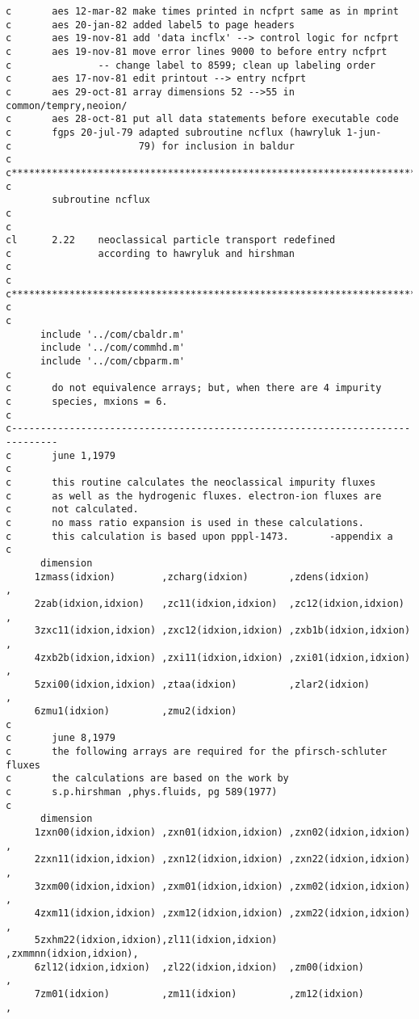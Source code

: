 \begin{verbatim}
c       aes 12-mar-82 make times printed in ncfprt same as in mprint
c       aes 20-jan-82 added label5 to page headers
c       aes 19-nov-81 add 'data incflx' --> control logic for ncfprt
c       aes 19-nov-81 move error lines 9000 to before entry ncfprt
c               -- change label to 8599; clean up labeling order
c       aes 17-nov-81 edit printout --> entry ncfprt
c       aes 29-oct-81 array dimensions 52 -->55 in common/tempry,neoion/
c       aes 28-oct-81 put all data statements before executable code
c       fgps 20-jul-79 adapted subroutine ncflux (hawryluk 1-jun-
c                      79) for inclusion in baldur
c
c**********************************************************************c
c
        subroutine ncflux
c
c
cl      2.22    neoclassical particle transport redefined
c               according to hawryluk and hirshman
c
c
c**********************************************************************c
c
c
      include '../com/cbaldr.m'
      include '../com/commhd.m'
      include '../com/cbparm.m'
c
c       do not equivalence arrays; but, when there are 4 impurity
c       species, mxions = 6.
c
c------------------------------------------------------------------------------
c       june 1,1979
c
c       this routine calculates the neoclassical impurity fluxes
c       as well as the hydrogenic fluxes. electron-ion fluxes are
c       not calculated.
c       no mass ratio expansion is used in these calculations.
c       this calculation is based upon pppl-1473.       -appendix a
c
      dimension
     1zmass(idxion)        ,zcharg(idxion)       ,zdens(idxion)        ,
     2zab(idxion,idxion)   ,zc11(idxion,idxion)  ,zc12(idxion,idxion)  ,
     3zxc11(idxion,idxion) ,zxc12(idxion,idxion) ,zxb1b(idxion,idxion) ,
     4zxb2b(idxion,idxion) ,zxi11(idxion,idxion) ,zxi01(idxion,idxion) ,
     5zxi00(idxion,idxion) ,ztaa(idxion)         ,zlar2(idxion)        ,
     6zmu1(idxion)         ,zmu2(idxion)
c
c       june 8,1979
c       the following arrays are required for the pfirsch-schluter fluxes
c       the calculations are based on the work by
c       s.p.hirshman ,phys.fluids, pg 589(1977)
c
      dimension
     1zxn00(idxion,idxion) ,zxn01(idxion,idxion) ,zxn02(idxion,idxion) ,
     2zxn11(idxion,idxion) ,zxn12(idxion,idxion) ,zxn22(idxion,idxion) ,
     3zxm00(idxion,idxion) ,zxm01(idxion,idxion) ,zxm02(idxion,idxion) ,
     4zxm11(idxion,idxion) ,zxm12(idxion,idxion) ,zxm22(idxion,idxion) ,
     5zxhm22(idxion,idxion),zl11(idxion,idxion)  ,zxmmnn(idxion,idxion),
     6zl12(idxion,idxion)  ,zl22(idxion,idxion)  ,zm00(idxion)         ,
     7zm01(idxion)         ,zm11(idxion)         ,zm12(idxion)         ,

\end{verbatim}
